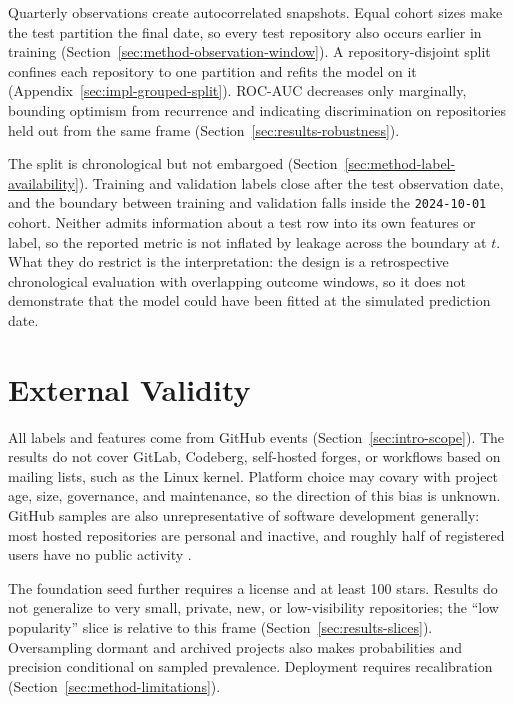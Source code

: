 Quarterly observations create autocorrelated snapshots. Equal cohort sizes make
the test partition the final date, so every test repository also occurs earlier
in training (Section~\ref{sec:method-observation-window}). A
repository-disjoint split confines each repository to one partition and refits
the model on it (Appendix~\ref{sec:impl-grouped-split}). ROC-AUC decreases only
marginally, bounding optimism from recurrence and indicating discrimination on
repositories held out from the same frame
(Section~\ref{sec:results-robustness}).

The split is chronological but not embargoed
(Section~\ref{sec:method-label-availability}). Training and validation labels
close after the test observation date, and the boundary between training and
validation falls inside the \texttt{2024-10-01} cohort. Neither admits
information about a test row into its own features or label, so the reported
metric is not inflated by leakage across the boundary at \(t\). What they do
restrict is the interpretation: the design is a retrospective chronological
evaluation with overlapping outcome windows, so it does not demonstrate that the
model could have been fitted at the simulated prediction date.

\section{External Validity}
\label{sec:validity-external}

All labels and features come from GitHub events
(Section~\ref{sec:intro-scope}). The results do not cover GitLab, Codeberg,
self-hosted forges, or workflows based on mailing lists, such as the Linux
kernel. Platform choice may covary with project age, size, governance, and
maintenance, so the direction of this bias is unknown.
GitHub samples are also unrepresentative of software development generally: most
hosted repositories are personal and inactive, and roughly half of registered
users have no public activity
\cite{kalliamvakou2016perils}.

The foundation seed further requires a license and at least 100 stars. Results
do not generalize to very small, private, new, or low-visibility repositories;
the ``low popularity'' slice is relative to this frame
(Section~\ref{sec:results-slices}). Oversampling dormant and archived projects
also makes probabilities and precision conditional on sampled prevalence.
Deployment requires recalibration (Section~\ref{sec:method-limitations}).

